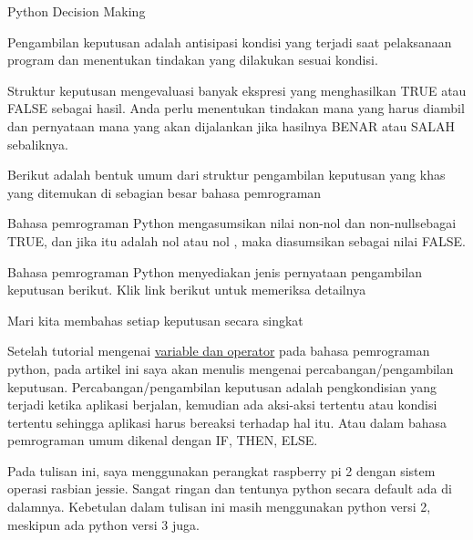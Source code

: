 \sloppy
Python Decision Making \par
\vspace{12pt}
\noindent 
Pengambilan keputusan adalah antisipasi kondisi yang terjadi saat pelaksanaan program dan menentukan tindakan yang dilakukan sesuai kondisi. \par
\vspace{12pt}
\noindent 
Struktur keputusan mengevaluasi banyak ekspresi yang menghasilkan TRUE atau FALSE sebagai hasil. $  $Anda perlu menentukan tindakan mana yang harus diambil dan pernyataan mana yang akan dijalankan jika hasilnya BENAR atau SALAH sebaliknya. \par
\vspace{12pt}
\noindent 
Berikut adalah bentuk umum dari struktur pengambilan keputusan yang khas yang ditemukan di sebagian besar bahasa pemrograman  \par
\vspace{12pt}
\noindent 
Bahasa pemrograman Python mengasumsikan nilai $  $non-nol $  $dan $  $non-nullsebagai TRUE, dan jika itu adalah $  $nol $  $atau $  $nol $  $, maka diasumsikan sebagai nilai FALSE. \par
\vspace{12pt}
\noindent 
Bahasa pemrograman Python menyediakan jenis pernyataan pengambilan keputusan berikut. $  $Klik link berikut untuk memeriksa detailnya \par
\vspace{12pt}
\noindent 
Mari kita membahas setiap keputusan secara singkat  \par
\vspace{12pt}
\noindent 
Setelah tutorial mengenai $  $\href{http://www.yudana.id/belajar-bahasa-pemrograman-python/}{variable dan operator}
 $  $pada bahasa pemrograman python, pada artikel ini saya akan menulis mengenai percabangan/pengambilan keputusan. Percabangan/pengambilan keputusan adalah pengkondisian yang terjadi ketika aplikasi berjalan, kemudian ada aksi-aksi tertentu atau kondisi tertentu sehingga aplikasi harus bereaksi terhadap hal itu. Atau dalam bahasa pemrograman umum dikenal dengan IF, THEN, ELSE. \par
\vspace{12pt}
\noindent 
Pada tulisan ini, saya menggunakan perangkat raspberry pi 2 dengan sistem operasi rasbian jessie. Sangat ringan dan tentunya python secara default ada di dalamnya. Kebetulan dalam tulisan ini masih menggunakan python versi 2, meskipun ada python versi 3 juga. \par
\vspace{12pt}
